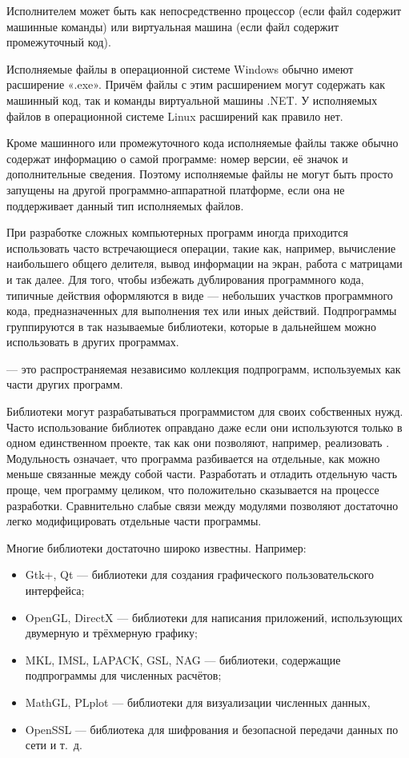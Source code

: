 Исполнителем может быть как непосредственно процессор (если файл
содержит машинные команды) или виртуальная машина (если файл содержит
промежуточный код).

Исполняемые файлы в операционной системе Windows обычно имеют
расширение «.exe». Причём файлы с этим расширением могут содержать как
машинный код, так и команды виртуальной машины .NET. У исполняемых
файлов в операционной системе Linux расширений как правило нет.

Кроме машинного или промежуточного кода исполняемые файлы также обычно
содержат информацию о самой программе: номер версии, её значок и
дополнительные сведения. Поэтому исполняемые файлы не могут быть
просто запущены на другой программно-аппаратной платформе, если она не
поддерживает данный тип исполняемых файлов.

При разработке сложных компьютерных программ иногда приходится
использовать часто встречающиеся операции, такие как, например,
вычисление наибольшего общего делителя, вывод информации на экран,
работа с матрицами и так далее. Для того, чтобы избежать дублирования
программного кода, типичные действия оформляются в виде
 — небольших участков программного
кода, предназначенных для выполнения тех или иных действий.
Подпрограммы группируются в так называемые библиотеки, которые в
дальнейшем можно использовать в других программах.

\begin{defn}
   — это распространяемая независимо
  коллекция подпрограмм, используемых как части других программ.
\end{defn}

Библиотеки могут разрабатываться программистом для своих собственных
нужд. Часто использование библиотек оправдано даже если они
используются только в одном единственном проекте, так как они
позволяют, например, реализовать . Модульность означает, что программа разбивается на
отдельные, как можно меньше связанные между собой части. Разработать и
отладить отдельную часть проще, чем программу целиком, что
положительно сказывается на процессе разработки. Сравнительно слабые
связи между модулями позволяют достаточно легко модифицировать
отдельные части программы.

Многие библиотеки достаточно широко известны. Например:
\begin{itemize}
\item Gtk+, Qt — библиотеки для создания графического
  пользовательского интерфейса;
\item OpenGL, DirectX — библиотеки для написания приложений,
  использующих двумерную и трёхмерную графику;
\item MKL, IMSL, LAPACK, GSL, NAG — библиотеки, содержащие
  подпрограммы для численных расчётов;
\item MathGL, PLplot — библиотеки для визуализации численных данных,
\item OpenSSL — библиотека для шифрования и безопасной передачи данных
  по сети и т.~д.
\end{itemize}

